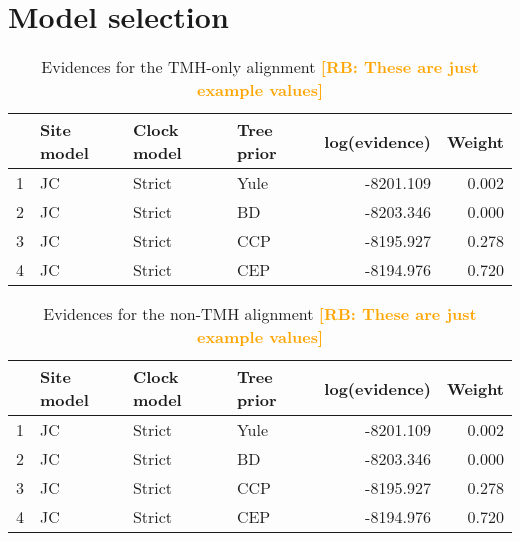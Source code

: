 \documentclass{article}
\newcommand{\richel}[1]{\textcolor{orange}{\textbf{[RB: #1]}}}
\begin{document}



\appendix

\section{Model selection}

\begin{table}[ht]
\centering
\begin{tabular}{rlllrr}
  \hline
 & Site model & Clock model & Tree prior & log(evidence) & Weight \\ 
  \hline
1 & JC & Strict & Yule & -8201.109 & 0.002 \\ 
  2 & JC & Strict & BD & -8203.346 & 0.000 \\ 
  3 & JC & Strict & CCP & -8195.927 & 0.278 \\ 
  4 & JC & Strict & CEP & -8194.976 & 0.720 \\ 
   \hline
\end{tabular}
\caption{
  Evidences for the TMH-only alignment
  \richel{These are just example values}
} 
\label{tab:evidences_tmh}
\end{table}

\begin{table}[ht]
\centering
\begin{tabular}{rlllrr}
  \hline
 & Site model & Clock model & Tree prior & log(evidence) & Weight \\ 
  \hline
1 & JC & Strict & Yule & -8201.109 & 0.002 \\ 
  2 & JC & Strict & BD & -8203.346 & 0.000 \\ 
  3 & JC & Strict & CCP & -8195.927 & 0.278 \\ 
  4 & JC & Strict & CEP & -8194.976 & 0.720 \\ 
   \hline
\end{tabular}
\caption{
  Evidences for the non-TMH alignment
  \richel{These are just example values}
} 
\label{tab:evidences_non_tmh}
\end{table}

\end{document}
